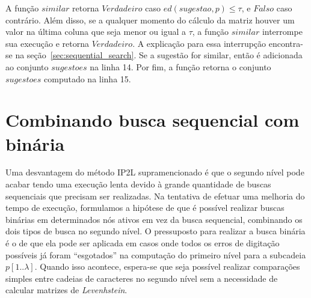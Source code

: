 A função $similar$ retorna $Verdadeiro$ caso $ed(sugestao, p) \leq \tau$, e $Falso$ caso contrário. Além disso, se a qualquer momento do cálculo da matriz houver um valor na última coluna que seja menor ou igual a $\tau$, a função $similar$ interrompe sua execução e retorna $Verdadeiro$. A explicação para essa interrupção encontra-se na seção~\ref{sec:sequential_search}. Se a sugestão for similar, então é adicionada ao conjunto $sugestoes$ na linha 14. Por fim, a função retorna o conjunto $sugestoes$ computado na linha 15.



\section{Combinando busca sequencial com binária}
\label{sec:IP2LB}

Uma desvantagem do método IP2L supramencionado é que o segundo nível pode acabar tendo uma execução lenta devido à grande quantidade de buscas sequenciais que precisam ser realizadas. Na tentativa de efetuar uma melhoria do tempo de execução, formulamos a hipótese de que é possível realizar buscas binárias em determinados nós ativos em vez da busca sequencial, combinando os dois tipos de busca no segundo nível. O pressuposto para realizar a busca binária é o de que ela pode ser aplicada em casos onde todos os erros de digitação possíveis já foram ``esgotados'' na computação do primeiro nível para a subcadeia $p[1..\lambda]$. Quando isso acontece, espera-se que seja possível realizar comparações simples entre cadeias de caracteres no segundo nível sem a necessidade de calcular matrizes de \textit{Levenhstein}.

